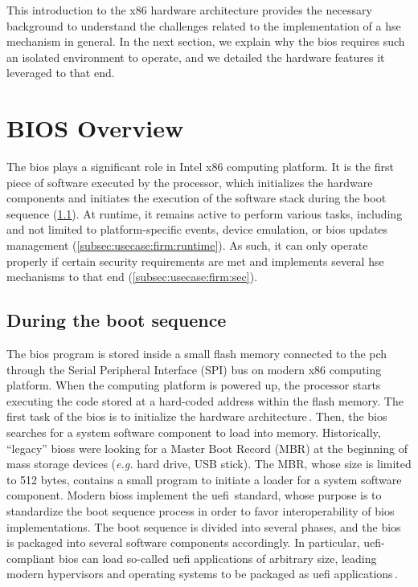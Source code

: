 This introduction to the x86 hardware architecture provides the necessary
background to understand the challenges related to the implementation of a
\ac{hse} mechanism in general.
%
In the next section, we explain why the \ac{bios} requires such an isolated
environment to operate, and we detailed the hardware features it leveraged to
that end.

\section{BIOS Overview}
\label{sec:usecase:firmware}

The \ac{bios} plays a significant role in Intel x86 computing platform.
%
It is the first piece of software executed by the processor, which initializes
the hardware components and initiates the execution of the software stack during
the boot sequence (\ref{subsec:usecase:firm:boot}).
%
At runtime, it remains active to perform various tasks, including and not
limited to platform-specific events, device emulation, or \ac{bios} updates
management (\ref{subsec:usecase:firm:runtime}).
%
As such, it can only operate properly if certain security requirements are met
and implements several \ac{hse} mechanisms to that end
(\ref{subsec:usecase:firm:sec}).

\subsection{During the boot sequence}
\label{subsec:usecase:firm:boot}

The \ac{bios} program is stored inside a small flash memory connected to the
\ac{pch} through the Serial Peripheral Interface (SPI) bus on modern x86
computing platform.
%
When the computing platform is powered up, the processor starts executing the
code stored at a hard-coded address within the flash memory.
%
The first task of the \ac{bios} is to initialize the hardware
architecture\,\cite{salihun2006bios}.
%
Then, the \ac{bios} searches for a system software component to load into
memory.
%
Historically, ``legacy'' \acp{bios} were looking for a Master Boot Record (MBR)
at the beginning of mass storage devices (\emph{e.g.} hard drive, USB stick).
%
The MBR, whose size is limited to 512 bytes, contains a small program to
initiate a loader for a system software component.
%
Modern \acp{bios} implement the \ac{uefi}\,\cite{zimmer2007uefi,uefi2017specs}
standard, whose purpose is to standardize the boot sequence process in order to
favor interoperability of \ac{bios} implementations.
%
The boot sequence is divided into several phases, and the \ac{bios} is packaged
into several software components accordingly.
%
In particular, \ac{uefi}-compliant \ac{bios} can load so-called \ac{uefi}
applications of arbitrary size, leading modern hypervisors and operating systems
to be packaged as \ac{uefi} applications\,\cite{2011efistub}.

